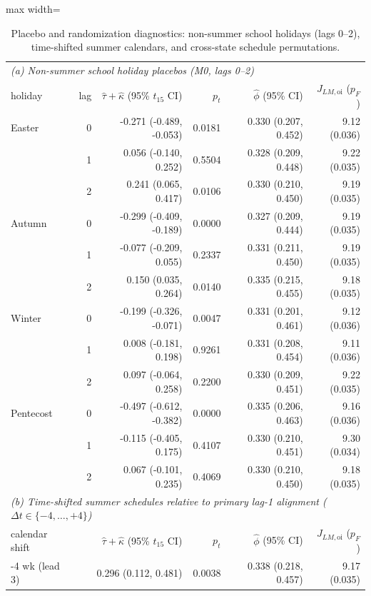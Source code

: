 \begin{table}[!t]
\centering
\caption{Placebo and randomization diagnostics: non-summer school holidays (lags 0--2), time-shifted summer calendars, and cross-state schedule permutations.}
\label{tab:rev-placebo}
\footnotesize
\setlength{\tabcolsep}{3.0pt}
\begin{adjustbox}{max width=\linewidth}
\begin{tabular}{lrrrrr}
\toprule
\multicolumn{6}{l}{\emph{(a) Non-summer school holiday placebos (M0, lags 0--2)}} \\
holiday & lag & $\hat\tau+\hat\kappa$ (95\% $t_{15}$ CI) & $p_t$ & $\hat\phi$ (95\% CI) & $J_{LM,\mathrm{oi}}$ ($p_F$) \\
\midrule
Easter & 0 & -0.271 (-0.489, -0.053) & 0.0181 & 0.330 (0.207, 0.452) & 9.12 (0.036) \\
 & 1 & 0.056 (-0.140, 0.252) & 0.5504 & 0.328 (0.209, 0.448) & 9.22 (0.035) \\
 & 2 & 0.241 (0.065, 0.417) & 0.0106 & 0.330 (0.210, 0.450) & 9.19 (0.035) \\
Autumn & 0 & -0.299 (-0.409, -0.189) & 0.0000 & 0.327 (0.209, 0.444) & 9.19 (0.035) \\
 & 1 & -0.077 (-0.209, 0.055) & 0.2337 & 0.331 (0.211, 0.450) & 9.19 (0.035) \\
 & 2 & 0.150 (0.035, 0.264) & 0.0140 & 0.335 (0.215, 0.455) & 9.18 (0.035) \\
Winter & 0 & -0.199 (-0.326, -0.071) & 0.0047 & 0.331 (0.201, 0.461) & 9.12 (0.036) \\
 & 1 & 0.008 (-0.181, 0.198) & 0.9261 & 0.331 (0.208, 0.454) & 9.11 (0.036) \\
 & 2 & 0.097 (-0.064, 0.258) & 0.2200 & 0.330 (0.209, 0.451) & 9.22 (0.035) \\
Pentecost & 0 & -0.497 (-0.612, -0.382) & 0.0000 & 0.335 (0.206, 0.463) & 9.16 (0.036) \\
 & 1 & -0.115 (-0.405, 0.175) & 0.4107 & 0.330 (0.210, 0.451) & 9.30 (0.034) \\
 & 2 & 0.067 (-0.101, 0.235) & 0.4069 & 0.330 (0.210, 0.450) & 9.18 (0.035) \\
\midrule
\multicolumn{6}{l}{\emph{(b) Time-shifted summer schedules relative to primary lag-1 alignment ($\Delta t \in \{-4,\dots,+4\}$)}} \\
calendar shift & \multicolumn{2}{r}{$\hat\tau+\hat\kappa$ (95\% $t_{15}$ CI)} & $p_t$ & $\hat\phi$ (95\% CI) & $J_{LM,\mathrm{oi}}$ ($p_F$) \\
\midrule
-4 wk (lead 3) & \multicolumn{2}{r}{0.296 (0.112, 0.481)} & 0.0038 & 0.338 (0.218, 0.457) & 9.17 (0.035) \\

\end{tabular}
\end{adjustbox}
\end{table}
